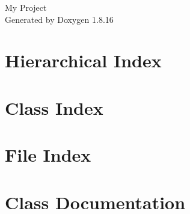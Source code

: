 \let\mypdfximage\pdfximage\def\pdfximage{\immediate\mypdfximage}\documentclass[twoside]{book}
\newcommand{\+}{\discretionary{\mbox{\scriptsize$\hookleftarrow$}}{}{}}
\newcommand{\clearemptydoublepage}{%
  \newpage{\pagestyle{empty}\cleardoublepage}%
}
\begin{document}
\hypersetup{pageanchor=false,
             bookmarksnumbered=true,
             pdfencoding=unicode
            }
\begin{titlepage}
\vspace*{7cm}
\begin{center}%
{\Large My Project }\\
\vspace*{1cm}
{\large Generated by Doxygen 1.8.16}\\
\end{center}
\end{titlepage}
\clearemptydoublepage
{}
\tableofcontents
\clearemptydoublepage
{}
\hypersetup{pageanchor=true}

\chapter{Hierarchical Index}

\chapter{Class Index}

\chapter{File Index}

\chapter{Class Documentation}
































\end{document}
